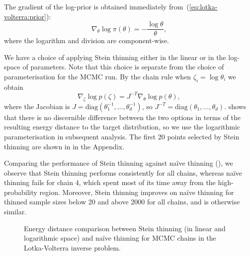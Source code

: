 \documentclass[11pt,a4paper]{report}
\begin{document}
The gradient of the log-prior is obtained immediately from~(\ref{eq:lotka-volterra:prior}):
\begin{equation*}
\nabla_{\theta} \log \pi(\theta) = -\frac{\log \theta}{\theta},
\end{equation*}
where the logarithm and division are component-wise.

We have a choice of applying Stein thinning either in the linear or in the log-space of parameters. Note that this choice is separate from the choice of parameterisation for the MCMC run. By the chain rule when $\zeta_i = \log \theta_i$ we obtain
\begin{equation*}
\nabla_\zeta \log p(\zeta) = J^{-T} \nabla_\theta \log p(\theta),
\end{equation*}
where the Jacobian is $J = \text{diag}(\theta_1^{-1}, \dots, \theta_d^{-1})$, so $J^{-T} =  \text{diag}(\theta_1, \dots, \theta_d)$.
 shows that there is no discernible difference between the two options in terms of the resulting energy distance to the target distribution, so we use the logarithmic parameterisation in subsequent analysis. The first 20 points selected by Stein thinning are shown in  in the Appendix.

Comparing the performance of Stein thinning against na\"ive thinning (), we observe that Stein thinning performs consistently for all chains, whereas na\"ive thinning fails for chain 4, which spent most of its time away from the high-probability region. Moreover, Stein thinning improves on na\"ive thinning for thinned sample sizes below 20 and above 2000 for all chains, and is otherwise similar.

\begin{figure}[h]
\centering
{}
\caption{Energy distance comparison between Stein thinning (in linear and logarithmic space) and na\"ive thinning for MCMC chains in the Lotka-Volterra inverse problem.
\label{fig:lotka-volterra:stein-thinning:energy-distance}}
\end{figure}
\end{document}
